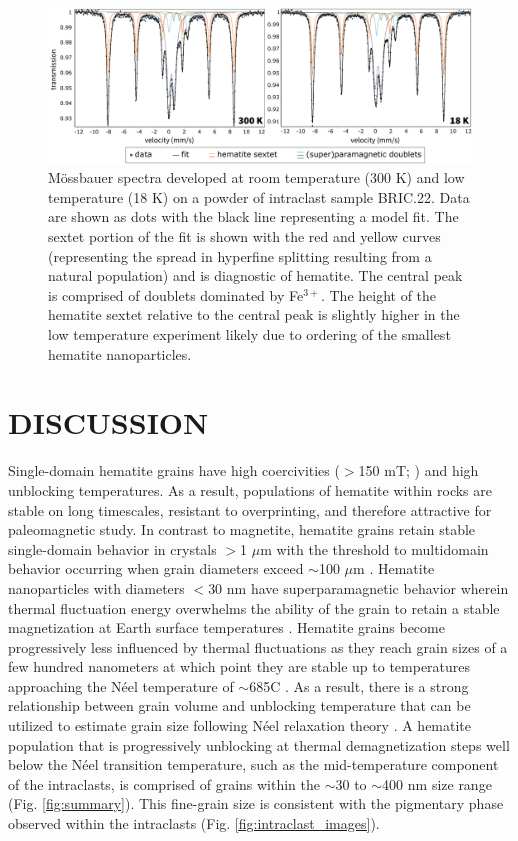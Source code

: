 \documentclass[draft]{agujournal2018}
\begin{document}
\begin{figure}[!ht]
\noindent\includegraphics[width=\textwidth]{figures/mossbauer.pdf}
\caption{\small{M{\"o}ssbauer spectra developed at room temperature (300 K) and low temperature (18 K) on a powder of intraclast sample BRIC.22. Data are shown as dots with the black line representing a model fit. The sextet portion of the fit is shown with the red and yellow curves (representing the spread in hyperfine splitting resulting from a natural population) and is diagnostic of hematite. The central peak is comprised of doublets dominated by Fe$^{3+}$. The height of the hematite sextet relative to the central peak is slightly higher in the low temperature experiment likely due to ordering of the smallest hematite nanoparticles.}}
\label{fig:mossbauer}
\end{figure}

\section*{DISCUSSION}

Single-domain hematite grains have high coercivities ($>$150 mT; \citealp{Ozdemir2014a}) and high unblocking temperatures. As a result, populations of hematite within rocks are stable on long timescales, resistant to overprinting, and therefore attractive for paleomagnetic study. In contrast to magnetite, hematite grains retain stable single-domain behavior in crystals $>$1 $\mu$m with the threshold to multidomain behavior occurring when grain diameters exceed $\sim$100 $\mu$m \citep{Kletetschka2002a, Ozdemir2014a}. Hematite nanoparticles with diameters $<$30 nm have superparamagnetic behavior wherein thermal fluctuation energy overwhelms the ability of the grain to retain a stable magnetization at Earth surface temperatures \citep{Ozdemir2014a}. Hematite grains become progressively less influenced by thermal fluctuations as they reach grain sizes of a few hundred nanometers at which point they are stable up to temperatures approaching the N\'eel temperature of $\sim$685\textdegree C \citep{Swanson-Hysell2011a, Ozdemir2014a}. As a result, there is a strong relationship between grain volume and unblocking temperature that can be utilized to estimate grain size following N\'eel relaxation theory \citep{Neel1949a, Swanson-Hysell2011a}. A hematite population that is progressively unblocking at thermal demagnetization steps well below the N\'eel transition temperature, such as the mid-temperature component of the intraclasts, is comprised of grains within the $\sim$30 to $\sim$400 nm size range (Fig. \ref{fig:summary}). This fine-grain size is consistent with the pigmentary phase observed within the intraclasts (Fig. \ref{fig:intraclast_images}). 
\end{document}
